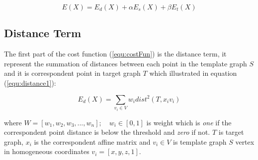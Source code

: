 \documentclass[../structure.tex]{subfiles}
\begin{document}
\begin{equation}
E(X) = E_{d}(X) + \alpha E_{s}(X) + \beta E_{t}(X)
\label{equ:costFun}
\end{equation}

\subsection{Distance Term}
The first part of the cost function (\ref{equ:costFun}) is the distance term, it represent the summation of distances between each point in the template graph $S$ and it is correspondent point in target graph $T$ which illustrated in equation (\ref{equ:distance1}):

\begin{equation}
E_{d}(X) = \sum_{v_{i} \in V} w_{i}dist^2(T,x_{i}v_{i})
\label{equ:distance1}
\end{equation}

where $W = [w_{1}, w_{2}, w_{3}, ..., w_{n}];\quad w_{i}\in [0,1]$ is weight which is \textit{one} if the correspondent point distance is below the threshold and \textit{zero} if not. $T$ is target graph, $x_{i}$ is the correspondent affine matrix and $v_{i}\in V$ is template graph $S$ vertex in homogeneous coordinates $v_{i} = [x,y,z,1]$.
\end{document}

